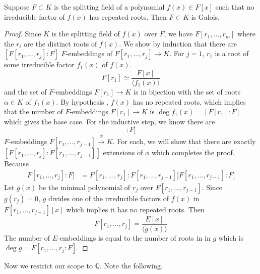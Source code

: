  \begin{theorem}
    \label{thm:6.6}
    Suppose $F \subset K$ is the splitting field of a polynomial $f(x) \in F[x]$ such that no irreducible factor of $f(x)$ has repeated roots. Then $F \subset K$ is Galois. 
  \end{theorem}
  \begin{proof}
    Since $K$ is the splitting field of $f(x)$ over $F$, we have $F[r_1, \ldots, r_m]$ where the $r_i$ are the distinct roots of $f(x)$. We show by induction that there are $[F[r_1, \ldots, r_j]:F]$ $F$-embeddings of $F[r_1, \ldots, r_j] \to K$. For $j = 1$, $r_1$ is a root of some irreducible factor $f_1 (x)$ of $f(x)$. 
    \begin{equation}
      F[r_1] \simeq \frac{F[x]}{\langle f_1 (x) \rangle}
    \end{equation} 
    and the set of $F$-embeddings $F[r_1] \to K$ is in bijection with the set of roots $\alpha \in K$ of $f_1 (x)$. By hypothesis , $f(x)$ has no repeated roots, which implies that the number of $F$-embeddings $F[r_1] \to K$ is $\deg{f_1 (x)} = [F[r_1]: F]$ which gives the base case. For the inductive step, we know there are 
    \begin{equation}
      [F[r_1, \ldots, r_{j-1}]: F] 
    \end{equation}
    $F$-embeddings $F[r_1, \ldots, r_{j-1}] \xrightarrow{\phi} K$. For each, we will show that there are exactly $[F[r_1, \ldots, r_j]: F[r_1, \ldots, r_{j-1}]]$ extensions of $\phi$ which completes the proof. Because 
    \begin{align}
      F[r_1, \ldots, r_j]: F] & = F[r_1, \ldots, r_j]: F[r_1, \ldots, r_{j-1}]] F[r_1, \ldots, r_{j-1}]: F]
    \end{align} 
    Let $g(x)$ be the minimal polynomial of $r_j$ over $F[r_1, \ldots, r_{j-1}]$. Since $g(r_j) = 0$, $g$ divides one of the irreducible factors of $f(x)$ in $F[r_1, \ldots, r_{j-1}] [x]$ which implies it has no repeated roots. Then 
    \begin{equation}
      F[r_1, \ldots, r_j] = \frac{E[x]}{\langle g(x)\rangle} 
    \end{equation}
    The number of $E$-embeddings is equal to the number of roots in in $g$ which is $\deg{g} = F[r_1, \ldots, r_j: F]$.
  \end{proof} 

  Now we restrict our scope to $\mathbb{Q}$. Note the following. 

